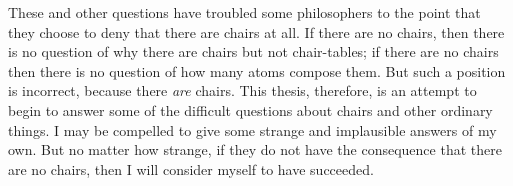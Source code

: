 \documentclass[11pt]{article}
\begin{document}
\begin{spacing}{1.25}
These and other questions have troubled some philosophers to the point
that they choose to deny that there are chairs at all.  If there are
no chairs, then there is no question of why there are chairs but not
chair-tables; if there are no chairs then there is no question of how
many atoms compose them.  But such a position is incorrect, because
there {\em are} chairs.  This thesis, therefore, is an attempt to
begin to answer some of the difficult questions about chairs and other
ordinary things.  I may be compelled to give some strange and
implausible answers of my own.  But no matter how strange, if they do
not have the consequence that there are no chairs, then I will
consider myself to have succeeded.

\ifstandalone
\end{spacing}


\fi
\end{document}
